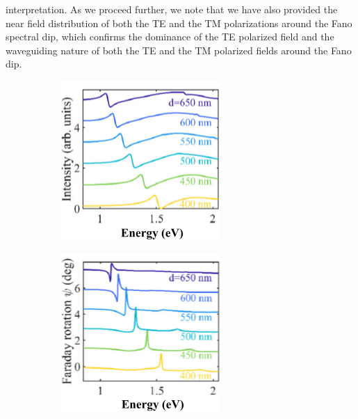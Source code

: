 \documentclass[13pt]{article}
\begin{document}
interpretation. As we proceed further, we note that we have also provided the near field distribution of both the TE and the TM polarizations around the Fano spectral dip, which confirms the dominance of the TE polarized field and the waveguiding nature of both the TE and the TM polarized fields around the Fano dip.
\begin{figure}[hbt!]
	\centering
	\begin{subfigure}[]{.49\linewidth}
		\centering
		\includegraphics[width=\linewidth]{Figures/figure2a.png}
		\caption{}
		\label{fig:figure2a}
	\end{subfigure}
	\hfill
	\begin{subfigure}[]{.49\linewidth}
		\centering
		\includegraphics[width=\linewidth]{Figures/figure2b.png}
		\caption{}
		\label{fig:figure2b}
	\end{subfigure}


\end{figure}
\end{document}
